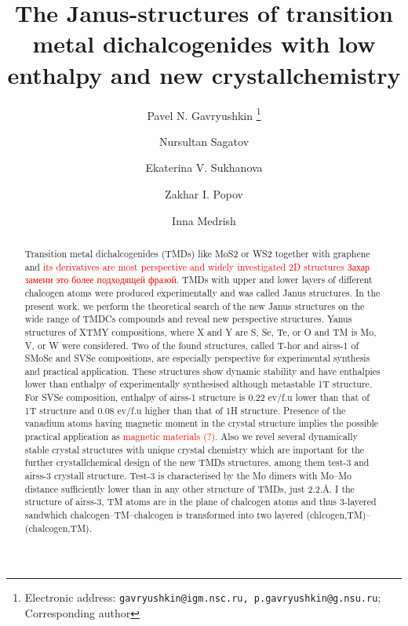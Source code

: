 \documentclass[a4paperm]{article}
\begin{document}

\title{The Janus-structures of transition metal dichalcogenides with low enthalpy and new crystallchemistry}


\author[1,2,3]{Pavel N. Gavryushkin
   \thanks{Electronic address: \texttt{gavryushkin@igm.nsc.ru, p.gavryushkin@g.nsu.ru}; Corresponding author}}     
\author[2]{Nursultan Sagatov}
\author[1]{Ekaterina V. Sukhanova}
\author[1]{Zakhar I. Popov}
\author[4]{Inna Medrish}



\date{}
\maketitle


\begin{abstract}
Transition metal dichalcogenides (TMDs) like MoS2 or WS2 together with graphene and \textcolor{red}{its derivatives are most perspective and widely investigated 2D structures Захар замени это более подходящей фразой}.
TMDs with upper and lower layers of different chalcogen atoms were produced experimentally and was called Janus structures.
In the present work, we perform the theoretical search of the new Janus structures on the  wide range of TMDCs compounds and reveal new perspective structures.
Yanus structures of XTMY compositions, where X and Y are S, Se, Te, or O and TM is Mo, V, or W were considered.
Two of the found structures, called T-hor and airss-1 of SMoSe and SVSe compositions, are especially perspective for experimental synthesis and practical application.
These structures show dynamic stability and have enthalpies lower than enthalpy of experimentally synthesised although metastable 1T structure.
For  SVSe composition, enthalpy of airss-1 structure is 0.22 ev/f.u lower than that of 1T structure and 0.08  ev/f.u higher than that of  1H structure.
Presence of the vanadium atoms having magnetic moment in the crystal structure implies the possible practical application as \textcolor{red}{magnetic materials (?)}.
Also we revel several dynamically stable crystal structures with unique crystal chemistry which are important for the further crystallchemical design of the new TMDs structures, among them test-3 and airss-3 crystall structure.
Test-3 is characterised by the Mo dimers with Mo--Mo distance sufficiently lower than in any other structure of TMDs, just 2.2.\AA.
I the structure of airss-3, TM atoms are in the plane of chalcogen atoms and thus 3-layered sandwhich chalcogen--TM--chalcogen is transformed into two layered (chlcogen,TM)--(chalcogen,TM).


\end{abstract}
\end{document}
